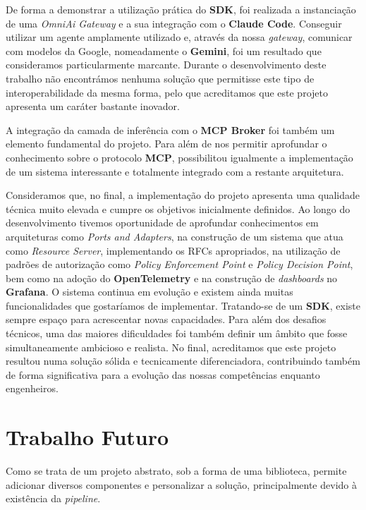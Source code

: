     De forma a demonstrar a utilização prática do \textbf{SDK}, foi realizada a instanciação de uma \textit{OmniAi Gateway} e a sua integração com o \textbf{Claude Code}. Conseguir utilizar um agente amplamente utilizado e, através da nossa \textit{gateway}, comunicar com modelos da Google, nomeadamente o \textbf{Gemini}, foi um resultado que consideramos particularmente marcante. Durante o desenvolvimento deste trabalho não encontrámos nenhuma solução que permitisse este tipo de interoperabilidade da mesma forma, pelo que acreditamos que este projeto apresenta um caráter bastante inovador.

    A integração da camada de inferência com o \textbf{MCP Broker} foi também um elemento fundamental do projeto. Para além de nos permitir aprofundar o conhecimento sobre o protocolo \textbf{MCP}, possibilitou igualmente a implementação de um sistema interessante e totalmente integrado com a restante arquitetura.

    Consideramos que, no final, a implementação do projeto apresenta uma qualidade técnica muito elevada e cumpre os objetivos inicialmente definidos. Ao longo do desenvolvimento tivemos oportunidade de aprofundar conhecimentos em arquiteturas como \textit{Ports and Adapters}, na construção de um sistema que atua como \textit{Resource Server}, implementando os RFCs apropriados, na utilização de padrões de autorização como \textit{Policy Enforcement Point} e \textit{Policy Decision Point}, bem como na adoção do \textbf{OpenTelemetry} e na construção de \textit{dashboards} no \textbf{Grafana}. O sistema continua em evolução e existem ainda muitas funcionalidades que gostaríamos de implementar. Tratando-se de um \textbf{SDK}, existe sempre espaço para acrescentar novas capacidades. Para além dos desafios técnicos, uma das maiores dificuldades foi também definir um âmbito que fosse simultaneamente ambicioso e realista. No final, acreditamos que este projeto resultou numa solução sólida e tecnicamente diferenciadora, contribuindo também de forma significativa para a evolução das nossas competências enquanto engenheiros.



\section{Trabalho Futuro}

Como se trata de um projeto abstrato, sob a forma de uma biblioteca, permite adicionar diversos componentes e personalizar a solução, principalmente devido à existência da \textit{pipeline}.


